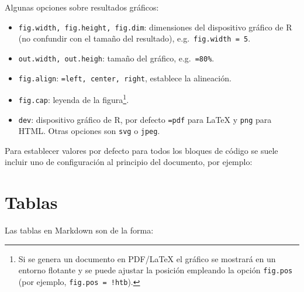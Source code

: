 \documentclass[
]{book}
\newenvironment{Shaded}{\begin{snugshade}}{\end{snugshade}}
\newcommand{\InformationTok}[1]{\textcolor[rgb]{0.56,0.35,0.01}{\textbf{\textit{#1}}}}
\providecommand{\tightlist}{%
  \setlength{\itemsep}{0pt}\setlength{\parskip}{0pt}}
\theoremstyle{break}
\theoremstyle{nonumberplain}
\begin{document}
Algunas opciones sobre resultados gráficos:

\begin{itemize}
\tightlist
\item
  \texttt{fig.width,\ fig.height,\ fig.dim}: dimensiones del dispositivo gráfico de R
  (no confundir con el tamaño del resultado), e.g.~\texttt{fig.width\ =\ 5}.
\item
  \texttt{out.width,\ out.heigh}: tamaño del gráfico, e.g.~\texttt{=\textquotesingle{}80\%\textquotesingle{}}.
\item
  \texttt{fig.align}: \texttt{=\textquotesingle{}left\textquotesingle{},\ \textquotesingle{}center\textquotesingle{},\ \textquotesingle{}right\textquotesingle{}}, establece la alineación.
\item
  \texttt{fig.cap}: leyenda de la figura\footnote{Si se genera un documento en PDF/LaTeX el gráfico
    se mostrará en un entorno flotante y se puede ajustar la posición empleando la opción
    \texttt{fig.pos} (por ejemplo, \texttt{fig.pos\ =\ \textquotesingle{}!htb\textquotesingle{}}).}.
\item
  \texttt{dev}: dispositivo gráfico de R, por defecto \texttt{=\textquotesingle{}pdf\textquotesingle{}} para LaTeX y \texttt{\textquotesingle{}png\textquotesingle{}} para HTML.
  Otras opciones son \texttt{\textquotesingle{}svg\textquotesingle{}} o \texttt{\textquotesingle{}jpeg\textquotesingle{}}.
\end{itemize}

Para establecer valores por defecto para todos los bloques de código
se suele incluir uno de configuración al principio del documento, por ejemplo:

\begin{Shaded}
\end{Shaded}

\hypertarget{tablas}{%
\section{Tablas}\label{tablas}}

Las tablas en Markdown son de la forma:
\end{document}
